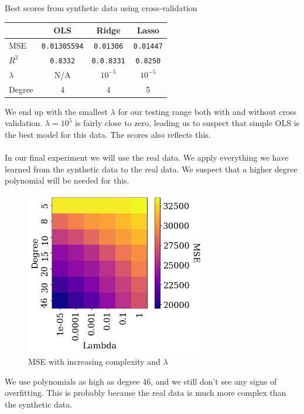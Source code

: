 \documentclass[twoside,11pt]{report}
\begin{document}
\begin{mytable}[float=!h,label=tab:toyscoresCrossval, width=0.7\textwidth]{Best scores from synthetic data using cross-validation}
\centering
\begin{tabular}{l|c|c|c}
    & OLS & Ridge & Lasso \\
    \hline
    MSE  &   \texttt{0.01305594} & \texttt{0.01306} & \texttt{0.01447} \\
    $R^2$     &   \texttt{0.8332} & \texttt{0.0.8331} & \texttt{0.8250} \\
    $\lambda$ &  N/A  & $10^{-5}$ & $10^{-5}$ \\
    Degree & 4 & 4 & 5
\end{tabular}%
\end{mytable}
We end up with the smallest $\lambda$ for our testing range both with and without cross validation. $\lambda=10^5$ is fairly close to zero, leading us to suspect that simple OLS is the best model for this data. The scores also reflects this.\\\\
In our final experiment we will use the real data. 
We apply everything we have learned from the synthetic data to the real data. We suspect that a higher degree polynomial will be needed for this.
\begin{figure}[!h]
    \begin{center}
        \includegraphics[width=0.7\textwidth]{../runsAndAdditions/heatmapRealData.png}
    \end{center}
    \caption{MSE with increasing complexity and $\lambda$}\label{fig:MSEOLSReal}
\end{figure}
We use polynomials as high as degree 46, and we still don't see any signs of overfitting. 
This is probably because the real data is much more complex than the synthetic data.
\end{document}
